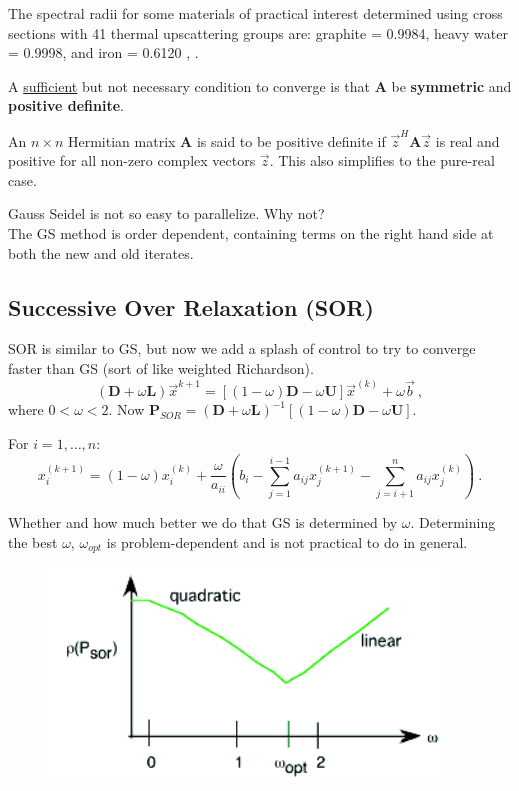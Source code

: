\documentclass[12pt]{article}
\newcommand{\ve}[1]{\ensuremath{\mathbf{#1}}}
\begin{document}
The spectral radii for some materials of practical interest determined using cross sections with 41 thermal upscattering groups are: graphite = 0.9984, heavy water = 0.9998, and iron = 0.6120 \cite{Adams2002}, \cite{Evans2009d}.

A \underline{sufficient} but not necessary condition to converge is that $\ve{A}$ be \textbf{symmetric} and \textbf{positive definite}.

An $n \times n$ Hermitian matrix $\ve{A}$ is said to be positive definite if $\vec{z}^H \ve{A} \vec{z}$ is real and positive for all non-zero complex vectors $\vec{z}$. This also simplifies to the pure-real case.

Gauss Seidel is not so easy to parallelize. Why not? \\The GS method is order dependent, containing terms on the right hand side at both the new and old iterates.


\subsection*{Successive Over Relaxation (SOR)}

SOR is similar to GS, but now we add a splash of control to try to converge faster than GS (sort of like weighted Richardson). 
%
\[(\ve{D} + \omega \ve{L})\vec{x}^{k+1} = [(1-\omega)\ve{D} - \omega \ve{U}] \vec{x}^{(k)} + \omega\vec{b}\:, \]
%
where $0 < \omega < 2$. Now $\ve{P}_{SOR} = (\ve{D} + \omega\ve{L})^{-1} [(1-\omega)\ve{D} - \omega \ve{U}]$. 

For $i = 1, \dots, n$:
\[ x^{(k+1)}_i = (1-\omega)x_i^{(k)} + \frac{\omega}{a_{ii}}(b_i - \sum_{j=1}^{i-1} a_{ij} x_j^{(k+1)} - \sum_{j=i+1}^{n} a_{ij} x_j^{(k)}) \:.\]

Whether and how much better we do that GS is determined by $\omega$.
Determining the best $\omega$, $\omega_{opt}$ is problem-dependent and is not practical to do in general.
%
\begin{figure}[h!]
\begin{center}
\includegraphics[height=2.25in]{SOR-omega}
\end{center}
\end{figure}
\end{document}
